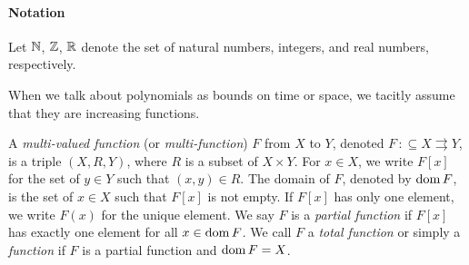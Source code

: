 \documentclass[envcountsame,orivec,oribibl]{llncs}
\newcommand{\pcolon}{\mathpunct{\,:\subseteq}}
\begin{document}


\paragraph{Notation}
Let $\mathbb N$, $\mathbb Z$, $\mathbb R$ denote the set of natural numbers, integers, and 
real numbers, respectively.

When we talk about polynomials as bounds on time or space, 
we tacitly assume that they are increasing functions. 

A {\em multi-valued function} (or {\em multi-function}) $F$ from $X$ to $Y$,
denoted $F \pcolon X \rightrightarrows Y$,
is a triple $(X, R, Y)$, where $R$ is a subset of $X \times Y$.
For $x \in X$, we write $F[x]$ for the set of $y \in Y$ such that $(x,y) \in R$.
The domain of $F$, denoted by $\mathop{\rm dom} F$, is the set of $x \in X$ such that 
$F[x]$ is not empty.
If $F[x]$ has only one element, we write $F(x)$ for the unique element.
We say $F$ is a {\em partial function} if $F[x]$ has exactly one element for all
$x \in \mathop{\rm dom} F$.
We call $F$ a {\em total function} or simply a {\em function} 
if $F$ is a partial function and $\mathop{\rm dom} F = X$.

\end{document}
